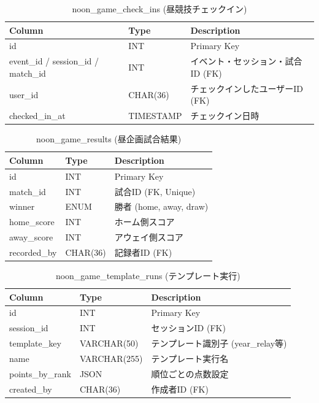 \documentclass[paper=a4, fontsize=11pt]{jlreq}
\begin{document}
\begin{table}[H]
    \centering
    \caption{noon\_game\_check\_ins (昼競技チェックイン)}
    \begin{tabularx}{\textwidth}{|l|l|X|}
        \toprule
        Column & Type & Description \\
        \midrule
        id & INT & Primary Key \\
        event\_id / session\_id / match\_id & INT & イベント・セッション・試合ID (FK) \\
        user\_id & CHAR(36) & チェックインしたユーザーID (FK) \\
        checked\_in\_at & TIMESTAMP & チェックイン日時 \\
        \bottomrule
    \end{tabularx}
\end{table}

\begin{table}[H]
    \centering
    \caption{noon\_game\_results (昼企画試合結果)}
    \begin{tabularx}{\textwidth}{|l|l|X|}
        \toprule
        Column & Type & Description \\
        \midrule
        id & INT & Primary Key \\
        match\_id & INT & 試合ID (FK, Unique) \\
        winner & ENUM & 勝者 (home, away, draw) \\
        home\_score & INT & ホーム側スコア \\
        away\_score & INT & アウェイ側スコア \\
        recorded\_by & CHAR(36) & 記録者ID (FK) \\
        \bottomrule
    \end{tabularx}
\end{table}

\begin{table}[H]
    \centering
    \caption{noon\_game\_template\_runs (テンプレート実行)}
    \begin{tabularx}{\textwidth}{|l|l|X|}
        \toprule
        Column & Type & Description \\
        \midrule
        id & INT & Primary Key \\
        session\_id & INT & セッションID (FK) \\
        template\_key & VARCHAR(50) & テンプレート識別子 (year\_relay等) \\
        name & VARCHAR(255) & テンプレート実行名 \\
        points\_by\_rank & JSON & 順位ごとの点数設定 \\
        created\_by & CHAR(36) & 作成者ID (FK) \\
        \bottomrule
    \end{tabularx}
\end{table}
\end{document}
